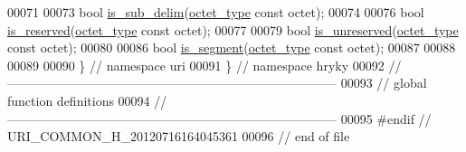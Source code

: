 \begin{DoxyCode}
00071 
00073     \textcolor{keywordtype}{bool} \hyperlink{namespacehryky_1_1uri_a0f9e547bf72c6148ff436dbffc94651e}{is_sub_delim}(\hyperlink{namespacehryky_a488cba8b666be33ccca70e819684e3c8}{octet_type} \textcolor{keyword}{const} octet);
00074 
00076     \textcolor{keywordtype}{bool} \hyperlink{namespacehryky_1_1uri_a3051f943d27c6213bba82b8cb8e0b6c5}{is_reserved}(\hyperlink{namespacehryky_a488cba8b666be33ccca70e819684e3c8}{octet_type} \textcolor{keyword}{const} octet);
00077 
00079     \textcolor{keywordtype}{bool} \hyperlink{namespacehryky_1_1uri_a95ad9502034176c355abd2c716d107d3}{is_unreserved}(\hyperlink{namespacehryky_a488cba8b666be33ccca70e819684e3c8}{octet_type} \textcolor{keyword}{const} octet);
00080 
00086     \textcolor{keywordtype}{bool} \hyperlink{namespacehryky_1_1uri_ab7d939b992c5f913bc116db33e213786}{is_segment}(\hyperlink{namespacehryky_a488cba8b666be33ccca70e819684e3c8}{octet_type} \textcolor{keyword}{const} octet);
00087 
00088     
00089 
00090 \} \textcolor{comment}{// namespace uri}
00091 \} \textcolor{comment}{// namespace hryky}
00092 \textcolor{comment}{//
      ------------------------------------------------------------------------------}
00093 \textcolor{comment}{// global function definitions}
00094 \textcolor{comment}{//
      ------------------------------------------------------------------------------}
00095 \textcolor{preprocessor}{#endif // URI\_COMMON\_H\_20120716164045361}
00096 \textcolor{preprocessor}{}\textcolor{comment}{// end of file}
\end{DoxyCode}
